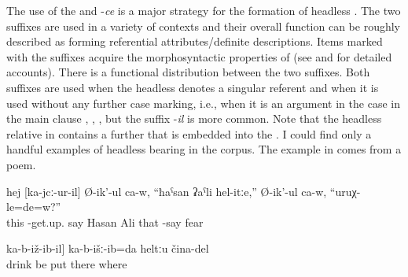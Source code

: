 The use of the   and -\textit{ce} is a major strategy for the formation of headless . The two suffixes are used in a variety of contexts and their overall function can be roughly described as forming referential attributes\slash definite descriptions. Items marked with the suffixes acquire the morphosyntactic properties of  (see  and  for detailed accounts). There is a functional distribution between the two suffixes. Both suffixes are used when the headless  denotes a singular referent and when it is used without any further case marking, i.e., when it is an argument in the  case in the main clause  , , , but the suffix -\textit{il} is more common. Note that the headless relative in  contains a further  that is embedded into the . I could find only a handful examples of headless  bearing  in the corpus. The example in  comes from a poem.  

%
\begin{exe}
	\ex	\label{ex:The one who is standing says}
	\gll	hej	[ka-jcː-ur-il]	Ø-ik'-ul	ca-w, ``ħaˁsan	ʡaˁli	hel-itːe,''	Ø-ik'-ul	ca-w,	``uruχ-le=de=w?''\\
		this	-get.up.	say	 Hasan	Ali	that	-say		fear\\
	\glt	{}

	\ex	\label{ex:‎The one where they are sitting and drinking, I put this (picture) somewhere}
	\gll	[[b-učː-ul]	ka-b-iž-ib-il]	ka-b-išː-ib=da	heltːu	čina-del\\
		drink	be	put	there where\\
	\glt	{}
\end{exe}

